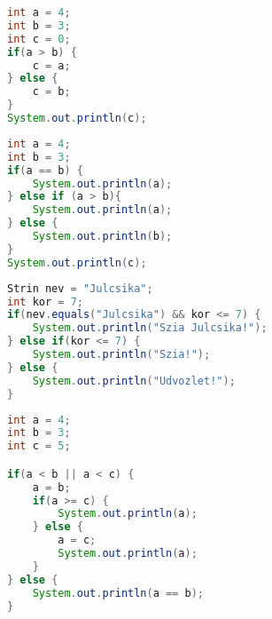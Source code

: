 \documentclass{article}
\begin{document}
\begin{lstlisting}[language=Java, caption=Muvelet 1.]
int a = 4;
int b = 3;
int c = 0;
if(a > b) {
    c = a;
} else {
    c = b;
}
System.out.println(c);
\end{lstlisting}

\begin{lstlisting}[language=Java, caption=Muvelet 2.]
int a = 4;
int b = 3;
if(a == b) {
    System.out.println(a);
} else if (a > b){
    System.out.println(a);
} else {
    System.out.println(b);
}
System.out.println(c);
\end{lstlisting}

\newpage

\begin{lstlisting}[language=Java, caption=Muvelet 3.]
Strin nev = "Julcsika";
int kor = 7;
if(nev.equals("Julcsika") && kor <= 7) {
    System.out.println("Szia Julcsika!");
} else if(kor <= 7) {
    System.out.println("Szia!");
} else {
    System.out.println("Udvozlet!");
}
\end{lstlisting}

\begin{lstlisting}[language=Java, caption=Muvelet 4.]
int a = 4;
int b = 3;
int c = 5;

if(a < b || a < c) {
    a = b;
    if(a >= c) {
        System.out.println(a);
    } else {
        a = c;
        System.out.println(a);
    }
} else {
    System.out.println(a == b);
}

\end{lstlisting}
\end{document}
